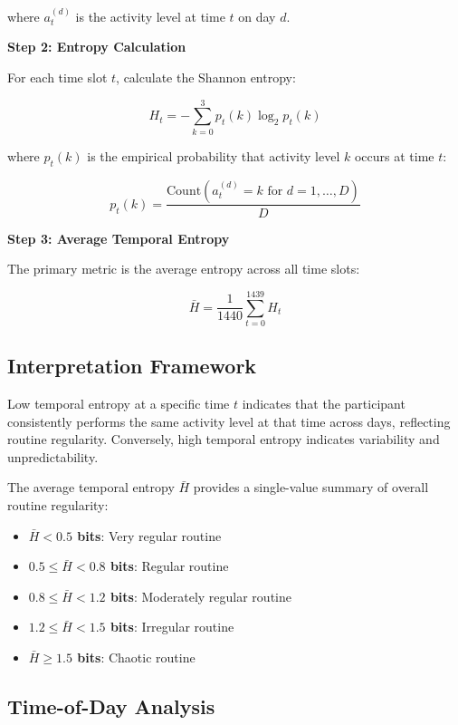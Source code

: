 \documentclass[12pt,letterpaper]{article}
\begin{document}
where $a_t^{(d)}$ is the activity level at time $t$ on day $d$.

\textbf{Step 2: Entropy Calculation}

For each time slot $t$, calculate the Shannon entropy:

\begin{equation}
H_t = -\sum_{k=0}^{3} p_t(k) \log_2 p_t(k)
\end{equation}

where $p_t(k)$ is the empirical probability that activity level $k$ occurs at time $t$:

\begin{equation}
p_t(k) = \frac{\text{Count}(a_t^{(d)} = k \text{ for } d = 1, \ldots, D)}{D}
\end{equation}

\textbf{Step 3: Average Temporal Entropy}

The primary metric is the average entropy across all time slots:

\begin{equation}
\bar{H} = \frac{1}{1440} \sum_{t=0}^{1439} H_t
\end{equation}

\subsection{Interpretation Framework}

Low temporal entropy at a specific time $t$ indicates that the participant consistently performs the same activity level at that time across days, reflecting routine regularity. Conversely, high temporal entropy indicates variability and unpredictability.

The average temporal entropy $\bar{H}$ provides a single-value summary of overall routine regularity:

\begin{itemize}
    \item \textbf{$\bar{H} < 0.5$ bits}: Very regular routine
    \item \textbf{$0.5 \leq \bar{H} < 0.8$ bits}: Regular routine
    \item \textbf{$0.8 \leq \bar{H} < 1.2$ bits}: Moderately regular routine
    \item \textbf{$1.2 \leq \bar{H} < 1.5$ bits}: Irregular routine
    \item \textbf{$\bar{H} \geq 1.5$ bits}: Chaotic routine
\end{itemize}

\subsection{Time-of-Day Analysis}
\end{document}
